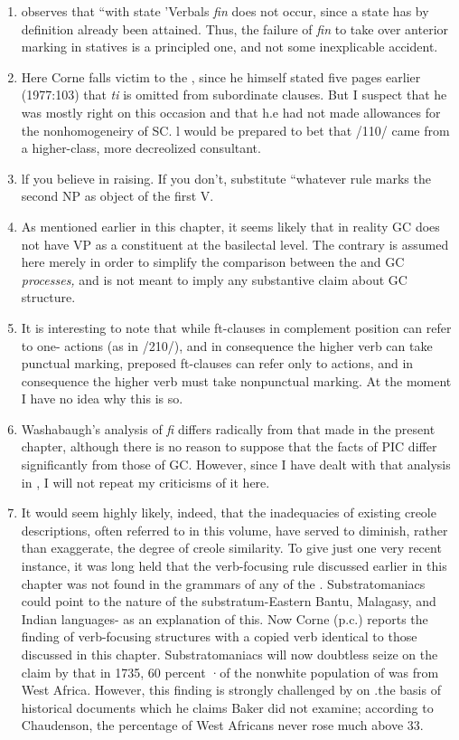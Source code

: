\begin{enumerate}
\item \citet{Corne1981} observes that ``with state 'Verbals \textit{fin} does not occur, since a state has by definition already been attained. Thus, the failure of \textit{fin} to take over anterior marking in statives is a principled one, and not some inexplicable accident.
\item Here Corne falls victim to the , since he himself stated five pages earlier (1977:103) that \textit{ti} is omitted from subordinate clauses. But I suspect that he was mostly right on this occasion and that h.e had not made allowances for the nonhomogeneiry of SC. l would be prepared to bet that /110/ came from a higher-class, more decreolized consultant.
\item lf you believe in raising. If you don't, substitute ``whatever rule marks the second NP as object of the first V.{\textquotedbl}
\item As mentioned earlier in this chapter, it seems likely that in reality GC does not have VP as a constituent at the basilectal level. The contrary is assumed here merely in order to simplify the com\-parison between the  and GC \textit{processes,} and is not meant to imply any substantive claim about GC structure.
\item It is interesting to note that while ft-clauses in complement position can refer to one- actions (as in /210/), and in consequence the higher verb can take punctual marking, preposed ft-clauses can refer only to  actions, and in consequence the higher verb must take nonpunctual marking. At the moment I have no idea why this is so.
\item Washabaugh's analysis of \textit{fi} differs radically from that made in the present chapter, although there is no reason to suppose that the facts of PIC differ significantly from those of GC. However, since I
have dealt with that analysis in \citet{Bickerton1980}, I will not repeat my criticisms of it here.
\item It would seem highly likely, indeed, that the inadequacies
of existing creole descriptions, often referred to in this volume, have served to diminish, rather than exaggerate, the degree of creole simi\-larity. To give just one very recent instance, it was long held that the verb-focusing rule discussed earlier in this chapter was not found in the grammars of any of the . Substratomaniacs could point to the nature of the substratum-Eastern Bantu, Malagasy, and Indian languages- as an explanation of this. Now Corne (p.c.) reports the finding of verb-focusing structures with a copied verb identical to those discussed in this chapter. Substratomaniacs will now doubtless seize on the claim by \citet{Baker1976} that in 1735, 60 percent ·of the nonwhite population of  was from West Africa. However, this finding is strongly challenged by \citet{Chaudenson1979} on .the basis of historical documents which he claims Baker did not examine; according to Chaudenson, the percentage of West Africans never rose much above 33.


\end{enumerate}
